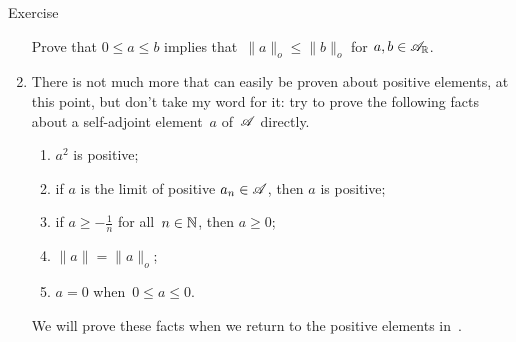 \documentclass[a]{subfiles}
\begin{document}
\begin{parsec}
\begin{point}{Exercise}
\begin{enumerate}
Prove that $0\leq a\leq b$ implies that~$\|a\|_o\leq\|b\|_o$
for $a,b\in\mathscr{A}_{\mathbb{R}}$.

\item
There is not much more that can easily be
proven about positive elements, at this point,
but don't take my word for it:
try to prove the following facts
about a self-adjoint element~$a$ of~$\mathscr{A}$ directly.
\begin{enumerate}
\item $a^2$ is positive;
\item if $a$ is the limit of positive $a_n\in\mathscr{A}$,
then $a$ is positive;
\item if $a\geq -\frac{1}{n}$ for all~$n\in \mathbb{N}$, then $a\geq 0$;
\item  $\|a\|=\|a\|_o$;
\item $a=0$ when~$0\leq a\leq 0$.
\end{enumerate}
We will prove these facts
when we return to the positive elements in~.
\end{enumerate}
\end{point}
\end{parsec}
\end{document}
